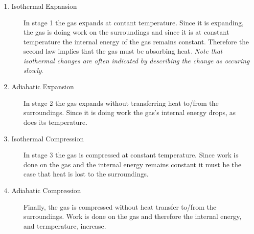 \documentclass[a4paper,12pt]{book}
\begin{document}
	\begin{description}
		\item[1. Isothermal Expansion] In stage 1 the gas expands at contant temperature. Since it is expanding, the gas is doing work on the surroundings and since it is at constant temperature the internal energy of the gas remains constant. Therefore the second law implies that the gas must be absorbing heat. \emph{Note that isothermal changes are often indicated by describing the change as occuring slowly.}
		\item[2. Adiabatic Expansion] In stage 2 the gas expands without transferring heat to/from the surroundings. Since it is doing work the gas's internal energy drops, as does its temperature.
		\item[3. Isothermal Compression] In stage 3 the gas is compressed at constant temperature. Since work is done on the gas and the internal energy remains constant it must be the case that heat is lost to the surroundings.
		\item[4. Adiabatic Compression] Finally, the gas is compressed without heat transfer to/from the surroundings. Work is done on the gas and therefore the internal energy, and termperature, increase.
	\end{description}
	
\end{document}
